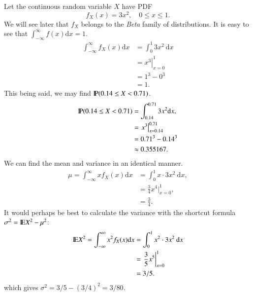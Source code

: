 \documentclass[captions=tableheading]{scrbook}
\begin{document}
\begin{example}
\label{exa:cont-pdf3x2}

Let the continuous random variable \(X\) have PDF
\[
f_{X}(x)=3x^{2},\quad0\leq x\leq 1.
\]
We will see later that \(f_{X}\) belongs to the \emph{Beta} family of distributions. It is easy to see that \(\int_{-\infty}^{\infty}f(x)\mathrm{d} x=1\).
\begin{align*}
\int_{-\infty}^{\infty}f_{X}(x)\mathrm{d} x & =\int_{0}^{1}3x^{2}\:\mathrm{d} x\\
 & =\left.x^{3}\right|_{x=0}^{1}\\
 & =1^{3}-0^{3}\\
 & =1.
\end{align*}
This being said, we may find \(\P(0.14\leq X<0.71)\).
\begin{align*}
\P(0.14\leq X<0.71) & =\int_{0.14}^{0.71}3x^{2}\mathrm{d} x,\\
 & =\left.x^{3}\right|_{x=0.14}^{0.71}\\
 & =0.71^{3}-0.14^{3}\\
 & \approx0.355167.
\end{align*}
We can find the mean and variance in an identical manner.
\begin{align*}
\mu=\int_{-\infty}^{\infty}xf_{X}(x)\mathrm{d} x & =\int_{0}^{1}x\cdot3x^{2}\:\mathrm{d} x,\\
 & =\frac{3}{4}x^{4}|_{x=0}^{1},\\
 & =\frac{3}{4}.
\end{align*}
It would perhaps be best to calculate the variance with the shortcut formula \(\sigma^{2}=\E X^{2}-\mu^{2}\):
\begin{align*}
\E X^{2}=\int_{-\infty}^{\infty}x^{2}f_{X}(x)\mathrm{d} x & =\int_{0}^{1}x^{2}\cdot3x^{2}\:\mathrm{d} x\\
 & =\left.\frac{3}{5}x^{5}\right|_{x=0}^{1}\\
 & =3/5.
\end{align*}
which gives \(\sigma^{2}=3/5-(3/4)^{2}=3/80\).
\end{example}
\end{document}
